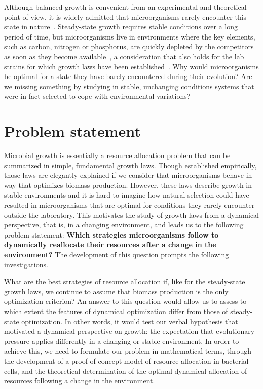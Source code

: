 Although balanced growth is convenient from an experimental and theoretical point of view, it is widely admitted that microorganisms rarely encounter this state in nature~\cite{schaechter_microbe_2006}.
Steady-state growth requires stable conditions over a long period of time, but microorganisms live in
environments where the key elements, such as carbon, nitrogen or phosphorus, are quickly depleted by the competitors as soon as they become available~\cite{mcarthur_microbial_2006,menge_nitrogen_2012,hobbie_microbes_2013}, a consideration that also holds for the lab strains for which growth laws have been established~\cite{savageau_escherichia_1983,savageau_demand_1998,blount_unexhausted_2015,vanelsas_survival_2011}.
Why would microorganisms be optimal for a state they have barely encountered during their evolution?
Are we missing something by studying in stable, unchanging conditions systems that were in fact selected to cope with environmental variations?

\section{Problem statement}
\label{sec:problemstatement}

Microbial growth is essentially a resource allocation problem that can be summarized in simple, fundamental growth laws.
Though established empirically, those laws are elegantly explained if we consider that microorganisms behave in way that optimizes biomass production.
However, these laws describe growth in stable environments and it is hard to imagine how natural selection could have resulted in microorganisms that are optimal for conditions they rarely encounter outside the laboratory.
This motivates the study of growth laws from a dynamical perspective, that is, in a changing environment, and leads us to the following problem statement: \textbf{Which strategies microorganisms follow to dynamically reallocate their resources after a change in the environment?}
The development of this question prompts the following investigations.

What are the best strategies of resource allocation if, like for the steady-state growth laws, we continue to assume that biomass production is the only optimization criterion?
An answer to this question would allow us to assess to which extent the features of dynamical optimization differ from those of steady-state optimization.
In other words, it would test our verbal hypothesis that motivated a dynamical perspective on growth: the expectation that evolutionary pressure applies differently in a changing or stable environment.
In order to achieve this, we need to formulate our problem in mathematical terms, through the development of a proof-of-concept model of resource allocation in bacterial cells, and the theoretical determination of the optimal dynamical allocation of resources following a change in the environment.

